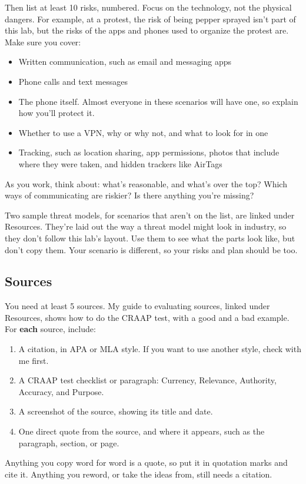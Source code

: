 \documentclass[12pt]{article}
\begin{document}
Then list at least 10 risks, numbered. Focus on the technology, not the physical dangers. For example, at a protest, the risk of being pepper sprayed isn't part of this lab, but the risks of the apps and phones used to organize the protest are. Make sure you cover:
\begin{itemize}
    \item Written communication, such as email and messaging apps
    \item Phone calls and text messages
    \item The phone itself. Almost everyone in these scenarios will have one, so explain how you'll protect it.
    \item Whether to use a VPN, why or why not, and what to look for in one
    \item Tracking, such as location sharing, app permissions, photos that include where they were taken, and hidden trackers like AirTags
\end{itemize}

As you work, think about: what's reasonable, and what's over the top? Which ways of communicating are riskier? Is there anything you're missing?

Two sample threat models, for scenarios that aren't on the list, are linked under Resources. They're laid out the way a threat model might look in industry, so they don't follow this lab's layout. Use them to see what the parts look like, but don't copy them. Your scenario is different, so your risks and plan should be too.

\subsection*{Sources}
You need at least 5 sources. My guide to evaluating sources, linked under Resources, shows how to do the CRAAP test, with a good and a bad example. For \textbf{each} source, include:
\begin{enumerate}
    \item A citation, in APA or MLA style. If you want to use another style, check with me first.
    \item A CRAAP test checklist or paragraph: Currency, Relevance, Authority, Accuracy, and Purpose.
    \item A screenshot of the source, showing its title and date.
    \item One direct quote from the source, and where it appears, such as the paragraph, section, or page.
\end{enumerate}
Anything you copy word for word is a quote, so put it in quotation marks and cite it. Anything you reword, or take the ideas from, still needs a citation.
\end{document}
